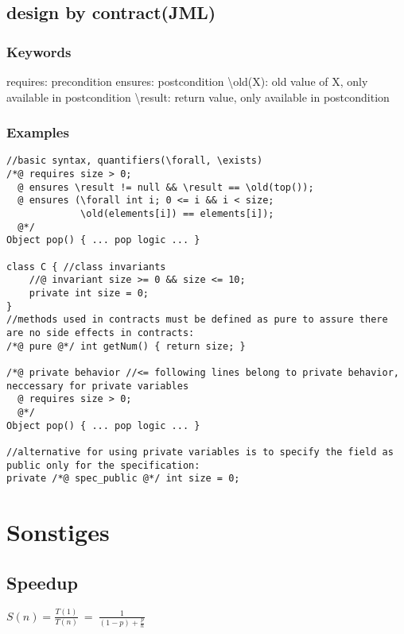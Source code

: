 \documentclass{article}
\begin{document}
\newpage

\subsection{design by contract(JML)}

\subsubsection{Keywords}

requires: precondition\newline
ensures: postcondition\newline
\textbackslash old(X): old value of X, only available in postcondition\newline
\textbackslash result: return value, only available in postcondition

\subsubsection{Examples}

\begin{verbatim}
//basic syntax, quantifiers(\forall, \exists)
/*@ requires size > 0;
  @ ensures \result != null && \result == \old(top());
  @ ensures (\forall int i; 0 <= i && i < size;
             \old(elements[i]) == elements[i]);
  @*/
Object pop() { ... pop logic ... }

class C { //class invariants
    //@ invariant size >= 0 && size <= 10;
    private int size = 0;
}
//methods used in contracts must be defined as pure to assure there are no side effects in contracts:
/*@ pure @*/ int getNum() { return size; }

/*@ private behavior //<= following lines belong to private behavior, neccessary for private variables
  @ requires size > 0;
  @*/
Object pop() { ... pop logic ... }

//alternative for using private variables is to specify the field as public only for the specification:
private /*@ spec_public @*/ int size = 0;

\end{verbatim}


\section{Sonstiges}

\subsection{Speedup}
{\huge$S(n)=\frac{T(1)}{T(n)}~=~\frac{1}{(1-p)+\frac{p}{n}}$}
\end{document}

